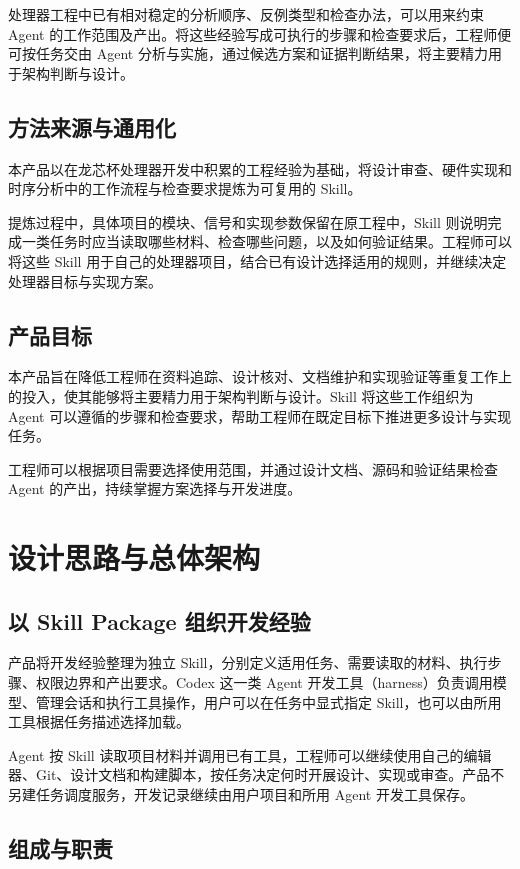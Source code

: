 \documentclass[UTF8,fontset=none,zihao=-4,a4paper]{ctexart}
\begin{document}
处理器工程中已有相对稳定的分析顺序、反例类型和检查办法，可以用来约束 Agent 的工作范围及产出。将这些经验写成可执行的步骤和检查要求后，工程师便可按任务交由 Agent 分析与实施，通过候选方案和证据判断结果，将主要精力用于架构判断与设计。

\subsection{方法来源与通用化}

本产品以在龙芯杯处理器开发中积累的工程经验为基础，将设计审查、硬件实现和时序分析中的工作流程与检查要求提炼为可复用的 Skill。

提炼过程中，具体项目的模块、信号和实现参数保留在原工程中，Skill 则说明完成一类任务时应当读取哪些材料、检查哪些问题，以及如何验证结果。工程师可以将这些 Skill 用于自己的处理器项目，结合已有设计选择适用的规则，并继续决定处理器目标与实现方案。

\subsection{产品目标}

本产品旨在降低工程师在资料追踪、设计核对、文档维护和实现验证等重复工作上的投入，使其能够将主要精力用于架构判断与设计。Skill 将这些工作组织为 Agent 可以遵循的步骤和检查要求，帮助工程师在既定目标下推进更多设计与实现任务。

工程师可以根据项目需要选择使用范围，并通过设计文档、源码和验证结果检查 Agent 的产出，持续掌握方案选择与开发进度。

\section{设计思路与总体架构}

\subsection{以 Skill Package 组织开发经验}

产品将开发经验整理为独立 Skill，分别定义适用任务、需要读取的材料、执行步骤、权限边界和产出要求。Codex 这一类 Agent 开发工具（harness）负责调用模型、管理会话和执行工具操作，用户可以在任务中显式指定 Skill，也可以由所用工具根据任务描述选择加载。

Agent 按 Skill 读取项目材料并调用已有工具，工程师可以继续使用自己的编辑器、Git、设计文档和构建脚本，按任务决定何时开展设计、实现或审查。产品不另建任务调度服务，开发记录继续由用户项目和所用 Agent 开发工具保存。

\subsection{组成与职责}
\end{document}

